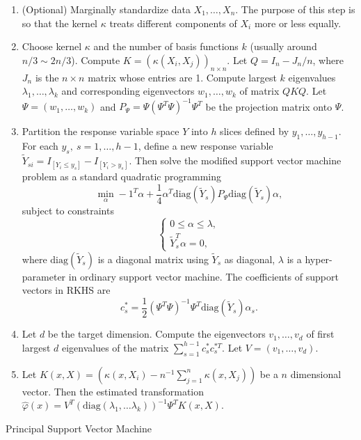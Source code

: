 \begin{algorithm}
\begin{enumerate}
\item (Optional) Marginally standardize data $X_{1},\ldots,X_{n}$. The
purpose of this step is so that the kernel $\kappa$ treats different
components of $X_{i}$ more or less equally. 
\item Choose kernel $\kappa$ and the number of basis {{} } {functions
}$k$ (usually around $n/3\sim2n/3$). Compute $K=\left(\kappa\left(X_{i},X_{j}\right)\right)_{n\times n}$.
Let $Q=I_{n}-J_{n}/n$, where $J_{n}$ is the $n\times n$ matrix
whose entries are 1. Compute largest $k$ eigenvalues $\lambda_{1},\ldots,\lambda_{k}$
and corresponding eigenvectors $w_{1},\ldots,w_{k}$ of matrix $QKQ$.
Let $\Psi=\left(w_{1},\ldots,w_{k}\right)$ and $P_{\Psi}=\Psi\left(\Psi^{T}\Psi\right)^{-1}\Psi^{T}$
be the projection matrix onto $\Psi$.
\item \label{enu:svm}Partition the response variable space $Y$ into $h$
slices defined by $y_{1},\ldots,y_{h-1}$. For each $y_{s},\: s=1,\ldots,h-1$,
define a new response variable $\tilde{Y}_{si}=I_{\left[Y_{i}\le y_{s}\right]}-I_{\left[Y_{i}>y_{s}\right]}$.
Then solve the modified support vector machine problem as a standard
quadratic programming 
\[
\min_{\alpha}-1^{T}\alpha+\frac{1}{4}\alpha^{T}\mathrm{diag}\left(\tilde{Y}_{s}\right)P_{\Psi}\mathrm{diag}\left(\tilde{Y}_{s}\right)\alpha,
\]
subject to constraints
\[
\begin{cases}
0\le\alpha\le\lambda,\\
\tilde{Y}_{s}^{T}\alpha=0,
\end{cases}
\]
where $\mathrm{diag}\left(\tilde{Y}_{s}\right)$ is a diagonal matrix
using $\tilde{Y}_{s}$ as diagonal, $\lambda$ is a hyper-parameter
in ordinary support vector machine. The coefficients of support vectors
in RKHS {{} } {are} 
\[
c_{s}^{*}=\frac{1}{2}\left(\Psi^{T}\Psi\right)^{-1}\Psi^{T}\mathrm{diag}\left(\tilde{Y}_{s}\right)\alpha_{s}.
\]

\item \label{enu:pca}Let $d$ be the target dimension. Compute the eigenvectors
$v_{1},\ldots,v_{d}$ of first largest $d$ eigenvalues of the matrix
$\sum_{s=1}^{h-1}c_{s}^{*}c_{s}^{*T}$. Let $V=\left(v_{1},\ldots,v_{d}\right).$
\item Let $K\left(x,X\right)=\left(\kappa\left(x,X_{i}\right)-n^{-1}\sum_{j=1}^{n}\kappa\left(x,X_{j}\right)\right)$
be a $n$ dimensional vector. Then the estimated transformation $\hat{\varphi}\left(x\right)=V^{T}\left(\mathrm{diag}\left(\lambda_{1},\ldots\lambda_{k}\right)\right)^{-1}\Psi^{T}K\left(x,X\right).$
\end{enumerate}
\protect\caption{Principal Support Vector Machine\label{alg:Principal-Support-Vector}}
\end{algorithm}
